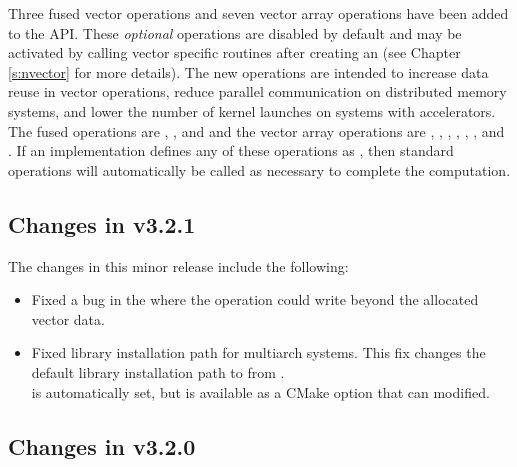 Three fused vector operations and seven vector array operations have been added
to the {\nvector} API. These \textit{optional} operations are disabled by
default and may be activated by calling vector specific routines after creating
an {\nvector} (see Chapter \ref{s:nvector} for more details). The new operations
are intended to increase data reuse in vector operations, reduce parallel
communication on distributed memory systems, and lower the number of kernel
launches on systems with accelerators. The fused operations are
,
, and
and the vector array operations are
,
,
,
,
,
, and\\
.
If an {\nvector} implementation defines any of these operations as ,
then standard {\nvector} operations will automatically be called as necessary to
complete the computation.

\subsection*{Changes in v3.2.1}

The changes in this minor release include the following:
\begin{itemize}
\item Fixed a bug in the {\cuda} {\nvector} where the  operation
  could write beyond the allocated vector data.
\item Fixed library installation path for multiarch systems. This fix changes the default
  library installation path to 
  from .\\
   is automatically
  set, but is available as a CMake option that can modified.
\end{itemize}

\subsection*{Changes in v3.2.0}

